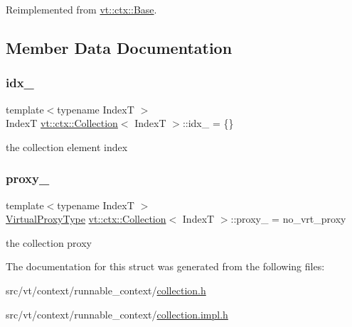 Reimplemented from \hyperlink{structvt_1_1ctx_1_1_base_a445badaaad72b44313084b2c95a13003}{vt\+::ctx\+::\+Base}.



\subsection{Member Data Documentation}
\mbox{\label{structvt_1_1ctx_1_1_collection_ac4de6446eac1e860f9c141bb22aff818}} 
\subsubsection{\texorpdfstring{idx\+\_\+}{idx\_}}
{\footnotesize\ttfamily template$<$typename IndexT $>$ \\
IndexT \hyperlink{structvt_1_1ctx_1_1_collection}{vt\+::ctx\+::\+Collection}$<$ IndexT $>$\+::idx\+\_\+ = \{\}\hspace{0.3cm}{\ttfamily [private]}}

the collection element index \mbox{\label{structvt_1_1ctx_1_1_collection_ad0a95fbcccdbcd0a525e809c81b6f148}} 
\subsubsection{\texorpdfstring{proxy\+\_\+}{proxy\_}}
{\footnotesize\ttfamily template$<$typename IndexT $>$ \\
\hyperlink{namespacevt_a1b417dd5d684f045bb58a0ede70045ac}{Virtual\+Proxy\+Type} \hyperlink{structvt_1_1ctx_1_1_collection}{vt\+::ctx\+::\+Collection}$<$ IndexT $>$\+::proxy\+\_\+ = no\+\_\+vrt\+\_\+proxy\hspace{0.3cm}{\ttfamily [private]}}

the collection proxy 

The documentation for this struct was generated from the following files\+:\begin{DoxyCompactItemize}
\item 
src/vt/context/runnable\+\_\+context/\hyperlink{collection_8h}{collection.\+h}\item 
src/vt/context/runnable\+\_\+context/\hyperlink{collection_8impl_8h}{collection.\+impl.\+h}\end{DoxyCompactItemize}
